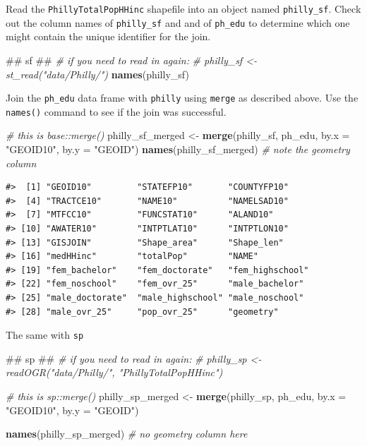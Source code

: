 \documentclass[]{book}
\newenvironment{Shaded}{\begin{snugshade}}{\end{snugshade}}
\newcommand{\KeywordTok}[1]{\textcolor[rgb]{0.13,0.29,0.53}{\textbf{#1}}}
\newcommand{\DataTypeTok}[1]{\textcolor[rgb]{0.13,0.29,0.53}{#1}}
\newcommand{\StringTok}[1]{\textcolor[rgb]{0.31,0.60,0.02}{#1}}
\newcommand{\CommentTok}[1]{\textcolor[rgb]{0.56,0.35,0.01}{\textit{#1}}}
\newcommand{\NormalTok}[1]{#1}
\theoremstyle{definition}
\theoremstyle{definition}
\theoremstyle{definition}
\theoremstyle{remark}
\begin{document}
Read the \texttt{PhillyTotalPopHHinc} shapefile into an object named
\texttt{philly\_sf}. Check out the column names of \texttt{philly\_sf}
and and of \texttt{ph\_edu} to determine which one might contain the
unique identifier for the join.

\begin{Shaded}
\begin{Highlighting}[]
\NormalTok{## sf ##}
\CommentTok{# if you need to read in again:}
\CommentTok{# philly_sf <- st_read("data/Philly/")}
\KeywordTok{names}\NormalTok{(philly_sf)}
\end{Highlighting}
\end{Shaded}

Join the \texttt{ph\_edu} data frame with \texttt{philly} using
\texttt{merge} as described above. Use the \texttt{names()} command to
see if the join was successful.

\begin{Shaded}
\begin{Highlighting}[]
\CommentTok{# this is base::merge()}
\NormalTok{philly_sf_merged <-}\StringTok{ }\KeywordTok{merge}\NormalTok{(philly_sf, ph_edu, }\DataTypeTok{by.x =} \StringTok{"GEOID10"}\NormalTok{, }\DataTypeTok{by.y =} \StringTok{"GEOID"}\NormalTok{)}
\KeywordTok{names}\NormalTok{(philly_sf_merged) }\CommentTok{# note the geometry column}
\end{Highlighting}
\end{Shaded}

\begin{verbatim}
#>  [1] "GEOID10"         "STATEFP10"       "COUNTYFP10"     
#>  [4] "TRACTCE10"       "NAME10"          "NAMELSAD10"     
#>  [7] "MTFCC10"         "FUNCSTAT10"      "ALAND10"        
#> [10] "AWATER10"        "INTPTLAT10"      "INTPTLON10"     
#> [13] "GISJOIN"         "Shape_area"      "Shape_len"      
#> [16] "medHHinc"        "totalPop"        "NAME"           
#> [19] "fem_bachelor"    "fem_doctorate"   "fem_highschool" 
#> [22] "fem_noschool"    "fem_ovr_25"      "male_bachelor"  
#> [25] "male_doctorate"  "male_highschool" "male_noschool"  
#> [28] "male_ovr_25"     "pop_ovr_25"      "geometry"
\end{verbatim}

The same with \texttt{sp}

\begin{Shaded}
\begin{Highlighting}[]
\NormalTok{## sp ##}
\CommentTok{# if you need to read in again:}
\CommentTok{# philly_sp <- readOGR("data/Philly/", "PhillyTotalPopHHinc") }

\CommentTok{# this is sp::merge()}
\NormalTok{philly_sp_merged <-}\StringTok{ }\KeywordTok{merge}\NormalTok{(philly_sp, ph_edu, }\DataTypeTok{by.x =} \StringTok{"GEOID10"}\NormalTok{, }\DataTypeTok{by.y =} \StringTok{"GEOID"}\NormalTok{)}

\KeywordTok{names}\NormalTok{(philly_sp_merged) }\CommentTok{# no geometry column here}
\end{Highlighting}
\end{Shaded}
\end{document}
